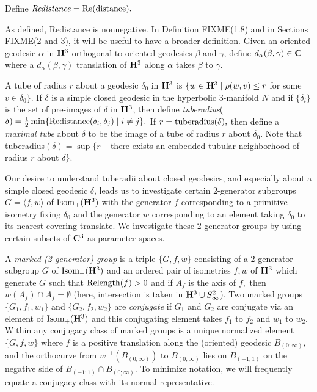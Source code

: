 Define ${\it Redistance} = {\rm Re} ({\rm distance}).$

As defined, Redistance is nonnegative.
In Definition FIXME(1.8) and in Sections FIXME(2 and 3),
it will be useful to have a broader definition. Given an oriented
geodesic $\alpha$ in ${\bf H}^3$ orthogonal to oriented geodesics $\beta$ and $\gamma$, define $d_\alpha(\beta,\gamma) \in {\bf C}$ where a
$d_\alpha(\beta,\gamma)$ translation of ${\bf H}^3$  along $\alpha$ takes $\beta$ to $\gamma.$
\enddemo

A tube of radius $r$ about a geodesic $\delta_0$ in ${\bf H}^3$ is 
$\{w \in {\bf H}^3 \mid \rho(w, v) \le r$ for some $v \in \delta_0 \}.$    
If $\delta$
is a simple closed geodesic in the hyperbolic $3$-manifold $N$ and if
$\{\delta_i \}$ is the set of pre-images of $\delta$ in ${\bf H}^3$, then define
{\it tuberadius}($\delta)={1 \over 2} \min 
\{{\rm Redistance}(\delta_i,\delta_j) \mid i\neq j \}.$
If $r = {\rm tuberadius}(\delta),$ 
then define a {\it maximal tube} about $\delta$ to be the
image of a tube of radius $r$ about $\delta_0.$  Note that
tuberadius$(\delta)=
\sup\{r \mid $ there exists an embedded tubular neighborhood of
radius $r$ about $\delta \}.$
\enddemo

Our desire to understand tuberadii about closed geodesics, and especially about a simple closed geodesic $\delta$, leads us to investigate certain 2-generator subgroups $G =
\langle f,w\rangle$  of ${\rm Isom}_+({\bf H}^3)$ with the generator $f$ corresponding to a primitive isometry fixing $\delta_0$ and the generator
$w$ corresponding to an element taking $\delta_0$ to its nearest covering translate.  We investigate these 2-generator groups by using certain
subsets of ${\bf C}^3$ as parameter spaces.

A {\it marked {\rm (2-}generator\/{\rm )} group} is a triple $\{G,f,w\}$ consisting of a 2-generator subgroup $G$ of ${\rm Isom}_+({\bf H}^3)$
and an ordered pair of isometries $f,w$ of ${\bf H}^3$ which generate $G$  such that ${\rm Relength}(f) > 0$ and if $A_f$ is the axis of $f,$ then $w(A_f)
\cap A_f  = \emptyset$  (here, intersection is taken in ${\bf H}^3 \cup S^2_\infty$). Two marked groups $\{G_1,f_1,w_1\}$ and $\{G_2,f_2,w_2\}$
are {\it conjugate} if $G_1$ and $G_2$ are conjugate via an element of ${\rm Isom}_+({\bf H}^3)$ and this conjugating element takes $f_1$ to $f_2$
and
$w_1$ to $w_2.$  Within any conjugacy class of marked groups is a unique normalized element
$\{G,f,w\}$ where $f$ is a
positive translation  along the (oriented) geodesic $B_{(0;\infty)},$  and the
orthocurve from $w^{-1}(B_{(0;\infty)})$ to $B_{(0;\infty)}$ lies on 
$ B_{(-1;1)}$
on the negative side of $ B_{(-1;1)}\cap B_{(0;\infty)}.$  
To minimize notation, we will frequently equate a conjugacy class with its normal representative.
\enddemo

